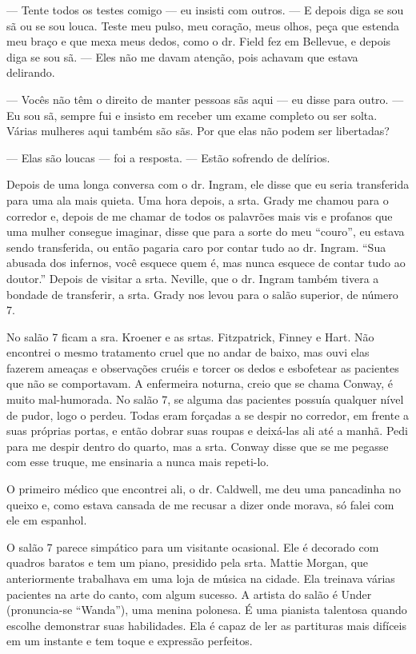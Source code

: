 --- Tente todos os testes comigo --- eu insisti com outros. 
--- E depois diga se sou sã ou se sou louca. Teste meu pulso, meu
coração, meus olhos, peça que estenda meu braço e que mexa meus dedos,
como o dr. Field fez em Bellevue, e depois diga se sou sã. --- Eles não me
davam atenção, pois achavam que estava delirando.

--- Vocês não têm o direito de manter pessoas sãs aqui --- eu disse para
outro. --- Eu sou sã, sempre fui e insisto em receber um exame completo
ou ser solta. Várias mulheres aqui também são sãs. Por que elas não
podem ser libertadas?

--- Elas são loucas --- foi a resposta. --- Estão sofrendo de delírios.

Depois de uma longa conversa com o dr. Ingram, ele disse que eu seria
transferida para uma ala mais quieta. Uma hora depois, a srta. Grady me
chamou para o corredor e, depois de me chamar de todos os palavrões mais
vis e profanos que uma mulher consegue imaginar, disse que para a sorte
do meu ``couro'', eu estava sendo transferida, ou então pagaria caro por
contar tudo ao dr. Ingram. ``Sua abusada dos infernos, você esquece
quem é, mas nunca esquece de contar tudo ao doutor.'' Depois de visitar
a srta. Neville, que o dr. Ingram também tivera a bondade de transferir,
a srta. Grady nos levou para o salão superior, de número 7.

No
salão 7 ficam a sra. Kroener e as srtas. Fitzpatrick, Finney e Hart. Não
encontrei o mesmo tratamento cruel que no andar de baixo, mas ouvi elas
fazerem ameaças e observações cruéis e torcer os dedos e esbofetear as
pacientes que não se comportavam. A enfermeira noturna, creio que se
chama Conway, é muito mal-humorada. No salão 7, se alguma das pacientes
possuía qualquer nível de pudor, logo o perdeu. Todas eram forçadas a
se despir no corredor, em frente a suas próprias portas, e então dobrar
suas roupas e deixá-las ali até a manhã. Pedi para me despir dentro do
quarto, mas a srta. Conway disse que se me pegasse com esse truque, me
ensinaria a nunca mais repeti-lo.

O primeiro médico que encontrei ali, o dr. Caldwell, me deu uma
pancadinha no queixo e, como estava cansada de me recusar a dizer onde
morava, só falei com ele em espanhol.

O salão 7 parece simpático para um visitante ocasional. Ele é decorado
com quadros baratos e tem um piano, presidido pela srta. Mattie Morgan,
que anteriormente trabalhava em uma loja de música na cidade. Ela
treinava várias pacientes na arte do canto, com algum sucesso. A artista
do salão é Under (pronuncia-se ``Wanda''), uma menina polonesa. É uma
pianista talentosa quando escolhe demonstrar suas habilidades. Ela é
capaz de ler as partituras mais difíceis em um instante e tem toque e
expressão perfeitos.

